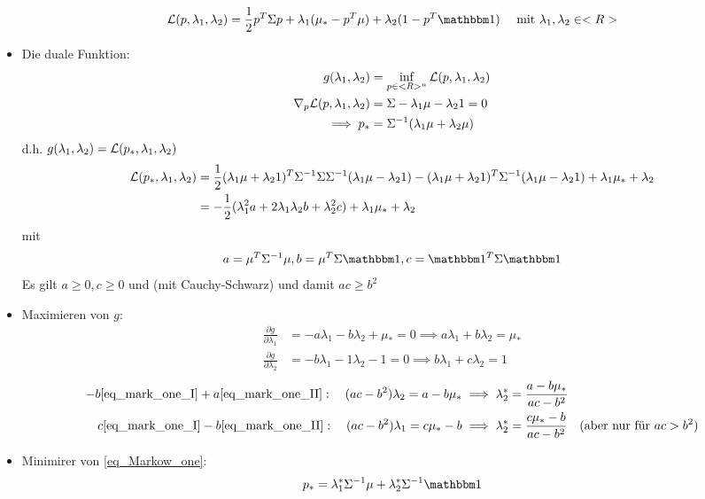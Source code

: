 \begin{itemize}
\begin{align*}
	\LL(p,\lambda_1, \lambda_2) = \half p^T \Sigma p + \lambda_1(\mu_{\ast} - p^T\mu) + \lambda_2(1-p^T \indi) \quad \mit \lambda_1, \lambda_2 \in \R
\end{align*}
	\item Die duale Funktion:
\begin{align*}
	g(\lambda_1, \lambda_2) &= \inf_{p \in <R>^n} \mathcal L(p, \lambda_1, \lambda_2)\\
	\nabla_p \mathcal L(p, \lambda_1, \lambda_2) &= \Sigma - \lambda_1 \mu - \lambda_2 1 = 0\\
	\implies p_{\ast} &= \Sigma^{-1}(\lambda_1 \mu + \lambda_2 \mu)
\end{align*}
d.h. $g(\lambda_1, \lambda_2) = \mathcal L(p_{\ast}, \lambda_1, \lambda_2)$
\begin{align*}
	\mathcal L(p_{\ast}, \lambda_1, \lambda_2) &=
	\frac{1}{2} (\lambda_1 \mu + \lambda_2 1)^T \Sigma^{-1}\Sigma\Sigma^{-1}(\lambda_1\mu - \lambda_2 1) - (\lambda_1 \mu + \lambda_2 1)^T \Sigma^{-1}(\lambda_1 \mu - \lambda_2 1) + \lambda_1 \mu_{\ast} + \lambda_2\\
	&= -\frac{1}{2} (\lambda_1^2 a + 2 \lambda_1 \lambda_2 b + \lambda_2^2 c) + \lambda_1 \mu_{\ast} + \lambda_2
\end{align*}
mit
\begin{align*}
	a = \mu^T \Sigma^{-1}\mu, b = \mu^T\Sigma\indi, c= \indi^T\Sigma\indi
\end{align*}
Es gilt $a \ge 0, c \ge 0$ und (mit Cauchy-Schwarz) und damit $ac \ge b^2$
\item Maximieren von $g$:
	\begin{align*}
		\frac{\partial g}{\partial \lambda_1} &= -a \lambda_1 - b \lambda_2 + \mu_{\ast} = 0 \implies a\lambda_1 + b \lambda_2 = \mu_{\ast} \tag{I}\label{eq_mark_one_I}\\
		\frac{\partial g}{\partial \lambda_2} &= -b \lambda_1 - 1 \lambda_2 - 1 = 0 \implies b\lambda_1 + c \lambda_2 = 1 \tag{II}\label{eq_mark_one_II}
	\end{align*}
	\begin{align*}
		-b\eqref{eq_mark_one_I} + a\eqref{eq_mark_one_II}:\quad (ac - b^2)\lambda_2 = a - b\mu_{\ast} &\implies \lambda^{\ast}_2 = \frac{a - b \mu_{\ast}}{ac - b^2}\\
		c\eqref{eq_mark_one_I} -b\eqref{eq_mark_one_II}:\quad (ac - b^2)\lambda_1 = c\mu_{\ast} - b &\implies \lambda^{\ast}_2 = \frac{c\mu_{\ast} - b }{ac - b^2} \quad (\text{aber nur für } ac > b^2 )
	\end{align*}
\item Minimirer von \eqref{eq_Markow_one}:
\begin{align*}
	p_{\ast} = \lambda_1^{\ast}\Sigma^{-1}\mu + \lambda_2^{\ast}\Sigma^{-1}\indi
\end{align*}
\end{itemize}

